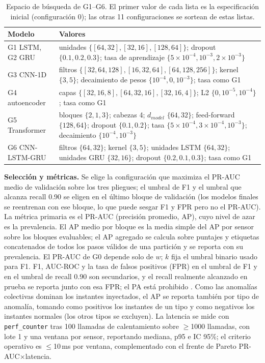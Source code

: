 \documentclass[conference]{IEEEtran}
\begin{document}
\begin{table}[t]
\centering
\caption{Espacio de b\'usqueda de G1--G6. El primer valor de cada lista es la
especificaci\'on inicial (configuraci\'on 0); las otras 11 configuraciones se
sortean de estas listas.}
\label{tab:ranges}
\footnotesize
\setlength{\tabcolsep}{3pt}
\renewcommand{\arraystretch}{0.9}
\begin{tabular}{@{}p{}p{}@{}}
\toprule
Modelo & Valores \\
\midrule
G1 LSTM, G2 GRU & unidades $\{[64,32],[32,16],[128,64]\}$; dropout $\{0.1,0.2,0.3\}$; tasa de aprendizaje $\{5\!\times\!10^{-4},10^{-3},2\!\times\!10^{-3}\}$ \\
G3 CNN-1D & filtros $\{[32,64,128],[16,32,64],[64,128,256]\}$; kernel $\{3,5\}$; decaimiento de pesos $\{10^{-4},0,10^{-3}\}$; tasa como G1 \\
G4 autoencoder & capas $\{[32,16,8],[64,32,16],[32,16,4]\}$; L2 $\{0,10^{-5},10^{-4}\}$; tasa como G1 \\
G5 Transformer & bloques $\{2,1,3\}$; cabezas 4; $d_{model}$ $\{64,32\}$; feed-forward $\{128,64\}$; dropout $\{0.1,0.2\}$; tasa $\{5\!\times\!10^{-4},3\!\times\!10^{-4},10^{-3}\}$; decaimiento $\{10^{-4},10^{-3}\}$ \\
G6 CNN-LSTM-GRU & filtros $\{64,32\}$; kernel $\{3,5\}$; unidades LSTM $\{64,32\}$; unidades GRU $\{32,16\}$; dropout $\{0.2,0.1,0.3\}$; tasa como G1 \\
\bottomrule
\end{tabular}
\end{table}

\textbf{Selecci\'on y m\'etricas.} Se elige la configuraci\'on que maximiza el
PR-AUC medio de validaci\'on sobre los tres pliegues; el umbral de F1 y el
umbral que alcanza recall 0.90 se eligen en el \'ultimo bloque de validaci\'on
(los modelos finales se reentrenan con ese bloque, lo que puede sesgar F1 y
FPR pero no el PR-AUC). La m\'etrica primaria es el PR-AUC (precisi\'on
promedio, AP), cuyo nivel de azar es la prevalencia. El AP medio por bloque es
la media simple del AP por sensor sobre los bloques evaluables; el AP agregado
se calcula sobre puntajes y etiquetas concatenados de todos los pasos v\'alidos
de una partici\'on y se reporta con su prevalencia. El PR-AUC de G0 depende
solo de $w$; $k$ fija el umbral binario usado para F1. F1, AUC-ROC y la tasa
de falsos positivos (FPR) en el umbral de F1 y en el umbral de recall 0.90 son
secundarios, y el recall realmente alcanzado en prueba se reporta junto con
esa FPR; el PA est\'a prohibido \cite{kim2022rigorous,sorbo2024navigating}.
Como las anomal\'ias colectivas dominan los instantes inyectados, el AP se
reporta tambi\'en por tipo de anomal\'ia, tomando como positivos los instantes
de un tipo y como negativos los instantes normales (los otros tipos se
excluyen). La latencia se mide con \texttt{perf\_counter} tras 100 llamadas de
calentamiento sobre $\geq$1000 llamadas, con lote 1 y una ventana por sensor,
reportando mediana, p95 e IC 95\%; el criterio operativo es $\leq$10\,ms por
ventana, complementado con el frente de Pareto PR-AUC$\times$latencia.
\end{document}
